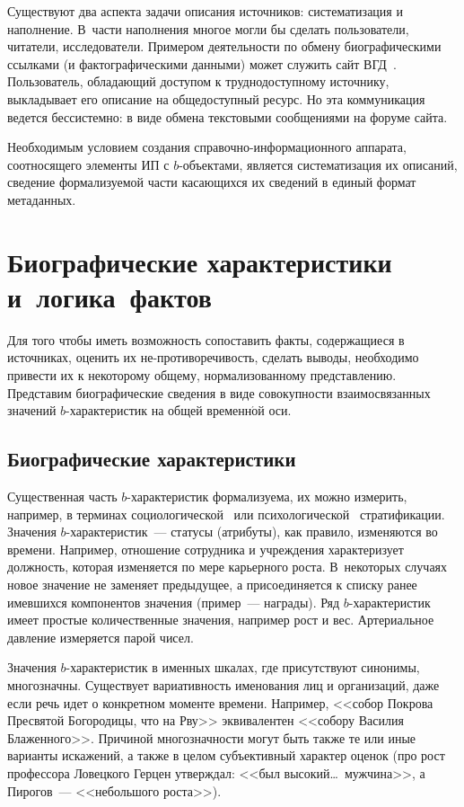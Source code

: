 \begin{multicols}{2}
  Существуют два аспекта задачи описания источников: систематизация и 
наполнение. В~части наполнения многое могли бы сделать пользователи, 
читатели, исследователи. Примером деятельности по обмену биографическими 
ссылками (и фактографическими данными) может служить сайт 
ВГД~\cite{13mar}. Пользователь, обладающий доступом к труднодоступному 
источнику, выкладывает его описание на общедоступный ресурс. Но эта 
коммуникация ведется бессистемно: в виде обмена текстовыми сообщениями 
на форуме сайта.
  
  Необходимым условием создания справочно-ин\-фор\-ма\-ци\-он\-но\-го аппарата, 
соотносящего элементы ИП с $b$-объектами, является систематизация их 
описаний, сведение формализуемой части касающихся их сведений в единый 
формат метаданных. 

\section{Биографические характеристики и~логика~фактов}
     
     Для того чтобы иметь возможность сопоставить факты, содержащиеся в 
источниках, оценить их 
не-\linebreak противоречивость, сделать выводы, необходимо 
привести их к некоторому общему, нормализованному представлению. 
Представим биографические сведения в виде совокупности взаимосвязанных 
значений $b$-характеристик на общей временн$\acute{\mbox{о}}$й оси. 

\subsection{Биографические характеристики}
  
  Существенная часть $b$-характеристик формализуема, их можно измерить, 
например, в терминах социологической~\cite{14mar} или 
психологической~\cite{15mar}\linebreak
стратификации. Значения $b$-характеристик~---\linebreak 
статусы (атрибуты), как правило, изменяются во времени. Например, 
отношение сотрудника и учреж\-де\-ния характеризует должность, которая 
изменяется по мере карьерного роста. В~некоторых случаях новое значение не 
заменяет предыдущее, а присоединяется к списку ранее имевшихся 
компонентов значения (пример~--- награды). Ряд $b$-ха\-рак\-те\-ри\-стик имеет 
простые количественные значения, например рост и вес. Артериальное 
давление измеряется парой чисел.
  
  Значения $b$-характеристик в именных шкалах, где присутствуют 
синонимы, многозначны. Существует вариативность именования лиц и 
организаций, даже если речь идет о конкретном моменте времени. Например, 
<<собор Покрова Пресвятой Богородицы, что на Рву>> эквивалентен <<собору 
Василия Блаженного>>. Причиной многозначности могут быть также те или 
иные варианты искажений, а также в целом субъективный характер оценок (про 
рост профессора Ловецкого Герцен утверждал: <<был высокий\ldots\ 
мужчина>>, а Пирогов~--- <<небольшого роста>>).
  

\end{multicols}
